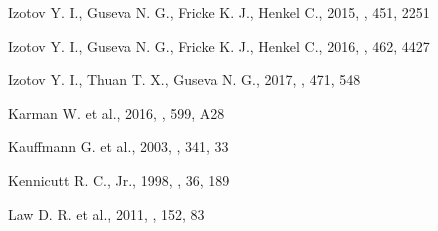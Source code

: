 \begin{thebibliography}{}

 Izotov Y. I., Guseva N. G., 
Fricke K. J., Henkel C., 2015, \mnras, 451, 2251



 Izotov Y. I., Guseva N. G.,
Fricke K. J., Henkel C., 2016, \mnras, 462, 4427

 Izotov Y. I., 
Thuan T. X., Guseva N. G., 2017, \mnras, 471, 548


 Karman W. et al., 2016, \aap, 599, A28


 Kauffmann G. et al., 2003, \mnras, 341, 33

 Kennicutt R. C., Jr.,
1998, \araa, 36, 189




 Law D. R. et al., 2011, \aj, 152, 83




\end{thebibliography}
